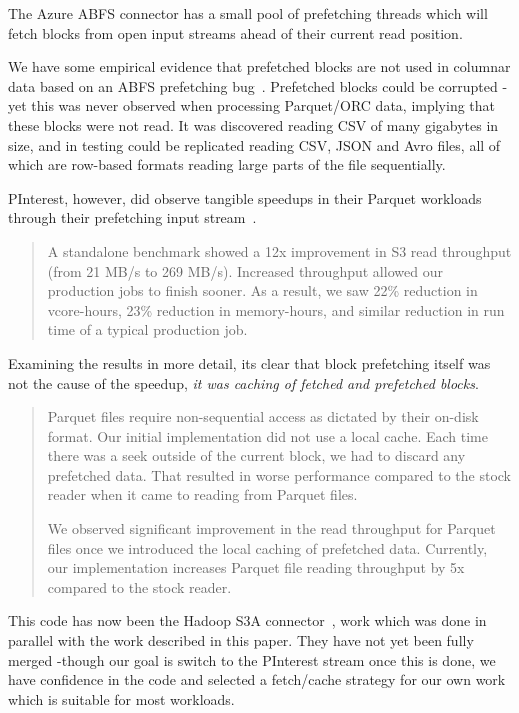 \documentclass[manuscript]{acmart}
\begin{document}
The Azure ABFS connector has a small pool of prefetching threads
which will fetch blocks from open input streams ahead of
their current read position.

We have some empirical evidence that prefetched blocks are not used
in columnar data based on an ABFS prefetching bug\ \cite{HADOOP-18521}.
Prefetched blocks could be corrupted -yet this was never observed when
processing Parquet/ORC data, implying that these blocks were not read.
It was discovered reading CSV of many gigabytes in size, and
in testing could be replicated reading CSV, JSON and Avro files,
all of which are row-based formats reading large parts of the file
sequentially.

PInterest, however, did observe tangible speedups in their Parquet workloads
through their prefetching input stream\ \cite{Bhalchandra:01}.

\begin{quotation}
 A standalone benchmark showed a 12x improvement in S3 read throughput
 (from 21 MB/s to 269 MB/s).
 Increased throughput allowed our production jobs to finish sooner.
 As a result, we saw 22\% reduction in vcore-hours, 23\% reduction in memory-hours,
 and similar reduction in run time of a typical production job.
\end{quotation}

Examining the results in more detail, its clear that block prefetching
itself was not the cause of the speedup, \emph{it was caching of fetched
and prefetched blocks}.

\begin{quotation}
Parquet files require non-sequential access as dictated by their on-disk format.
Our initial implementation did not use a local cache.
Each time there was a seek outside of the current block, we had to discard any prefetched data.
That resulted in worse performance compared to the stock reader when it came to reading from Parquet files.

We observed significant improvement in the read throughput for Parquet files once we
introduced the local caching of prefetched data.
Currently, our implementation increases Parquet file reading throughput by 5x compared to the stock
reader.
\end{quotation}

This code has now been the Hadoop S3A connector\ \cite{HADOOP-18028},
work which was done in parallel with the work described in this paper.
They have not yet been fully merged -though our goal is switch to the
PInterest stream once this is done, we have confidence in the code
and selected a fetch/cache strategy for our own work which is suitable
for most workloads.
\end{document}
